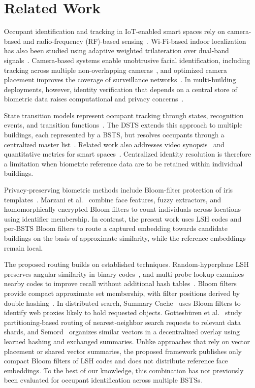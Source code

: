 \documentclass[pdflatex,sn-mathphys-num]{sn-jnl}%
\theoremstyle{thmstyleone}%
\theoremstyle{thmstyletwo}%
\theoremstyle{thmstylethree}%
\begin{document}
\section{Related Work}
\label{sec:related}

Occupant identification and tracking in IoT-enabled smart spaces rely on camera-based and radio-frequency (RF)-based sensing~\cite{mohan2020,WZSYGWLLHSC2025}. Wi-Fi-based indoor localization has also been studied using adaptive weighted trilateration over dual-band signals~\cite{MSSAB2019}. Camera-based systems enable unobtrusive facial identification, including tracking across multiple non-overlapping cameras~\cite{nair2021}, and optimized camera placement improves the coverage of surveillance networks~\cite{SM2022}. In multi-building deployments, however, identity verification that depends on a central store of biometric data raises computational and privacy concerns~\cite{mohan2020}.

State transition models represent occupant tracking through states, recognition events, and transition functions~\cite{MJG2011}. The DSTS extends this approach to multiple buildings, each represented by a BSTS, but resolves occupants through a centralized master list~\cite{mohan2020}. Related work also addresses video synopsis~\cite{NGA2022} and quantitative metrics for smart spaces~\cite{MMJ2025}. Centralized identity resolution is therefore a limitation when biometric reference data are to be retained within individual buildings.

Privacy-preserving biometric methods include Bloom-filter protection of iris templates~\cite{rathgeb2014}. Marzani et al.~\cite{marzani2026} combine face features, fuzzy extractors, and homomorphically encrypted Bloom filters to count individuals across locations using identifier membership. In contrast, the present work uses LSH codes and per-BSTS Bloom filters to route a captured embedding towards candidate buildings on the basis of approximate similarity, while the reference embeddings remain local.

The proposed routing builds on established techniques. Random-hyperplane LSH preserves angular similarity in binary codes~\cite{charikar2002}, and multi-probe lookup examines nearby codes to improve recall without additional hash tables~\cite{lv2007}. Bloom filters~\cite{bloom1970} provide compact approximate set membership, with filter positions derived by double hashing~\cite{kirsch2006}. In distributed search, Summary Cache~\cite{fan2000} uses Bloom filters to identify web proxies likely to hold requested objects. Gottesb{\"u}ren et al.~\cite{gottesbueren2024} study partitioning-based routing of nearest-neighbor search requests to relevant data shards, and Semord~\cite{wang2026semord} organizes similar vectors in a decentralized overlay using learned hashing and exchanged summaries. Unlike approaches that rely on vector placement or shared vector summaries, the proposed framework publishes only compact Bloom filters of LSH codes and does not distribute reference face embeddings. To the best of our knowledge, this combination has not previously been evaluated for occupant identification across multiple BSTSs.
\end{document}
